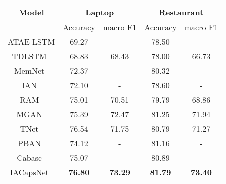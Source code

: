 \begin{tabular}{|c|c|c|c|c|}
\hline
Model & \multicolumn{2}{c|}{Laptop} & \multicolumn{2}{c|}{Restaurant} \\
\hline
& Accuracy & macro F1 & Accuracy & macro F1 \\
\hline
ATAE-LSTM \citep{wang-etal-2016-attention} & 69.27 & - & 78.50 & - \\
\hline
TDLSTM~\citep{tang-etal-2016-effective} & \underline{68.83} & \underline{68.43} & \underline{78.00} & \underline{66.73} \\
\hline
MemNet~\citep{tang-etal-2016-aspect} & 72.37 & - & 80.32 & - \\
\hline
IAN~\citep{ma2017interactive} & 72.10 & - & 78.60 & - \\
\hline
RAM~\citep{chen-etal-2017-recurrent} & 75.01 & 70.51 & 79.79 & 68.86 \\
\hline
MGAN~\citep{fan-etal-2018-multi} & 75.39 & 72.47 & 81.25 & 71.94 \\
\hline
TNet~\citep{li-etal-2018-transformation} & 76.54 & 71.75 & 80.79 & 71.27 \\
\hline
PBAN~\citep{gu-etal-2018-position} & 74.12 & - & 81.16 & - \\
\hline
Cabasc~\citep{liu2018content} & 75.07 & - & 80.89 & - \\
\hline
IACapsNet~\citep{du-etal-2019-capsule} & \textbf{76.80} & \textbf{73.29} & \textbf{81.79} & \textbf{73.40} \\
\hline
\end{tabular}